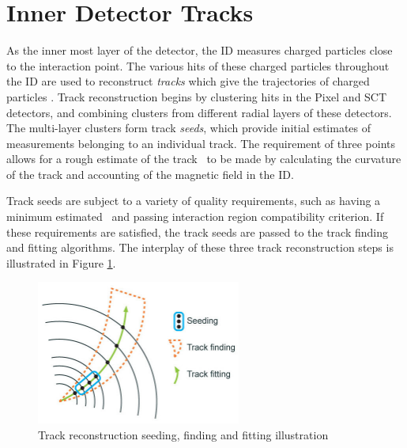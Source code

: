 \section{Inner Detector Tracks}
\label{sec:inner_det_tracks}
As the inner most layer of the detector, the ID measures charged particles close to the interaction point. The various hits of these charged particles throughout the ID are used to reconstruct \textit{tracks} which give the trajectories of charged particles \cite{track_finding}. Track reconstruction begins by clustering hits in the Pixel and SCT detectors, and combining clusters from different radial layers of these detectors. The multi-layer clusters form track \textit{seeds}, which provide initial estimates of measurements belonging to an individual track. The requirement of three points allows for a rough estimate of the track \pt~to be made by calculating the curvature of the track and accounting of the magnetic field in the ID. \par

Track seeds are subject to a variety of quality requirements, such as having a minimum estimated \pt~and passing interaction region compatibility criterion. If these requirements are satisfied, the track seeds are passed to the track finding and fitting algorithms. The interplay of these three track reconstruction steps is illustrated in Figure \ref{fig:track_reco}. 

\begin{figure}
        \centering
	\includegraphics[width=0.6\textwidth]{figures/ch5/track_reco}
	\caption{Track reconstruction seeding, finding and fitting illustration \cite{track_finding}}
	\label{fig:track_reco}
\end{figure}


